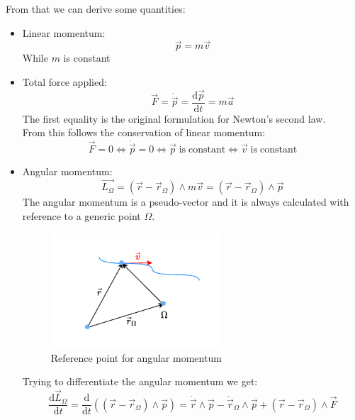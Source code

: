 From that we can derive some quantities:
\begin{itemize}
    \item Linear momentum: \begin{equation}\vec{p}=m\vec{v}\end{equation} While $m$ is constant
    \item Total force applied: \begin{equation}\vec{F}=\dot{\vec{p}}=\dfrac{\mathrm{d} \vec{p}}{\mathrm{d} t}=m\vec{a}\end{equation}The first equality is the original formulation for Newton's second law.\\From this follows the conservation of linear momentum:
    \begin{equation}\vec{F}=0 \iff\dot{\vec{p}}=0 \iff\vec{p}\;\mathrm{is\;constant} \iff\vec{v}\;\mathrm{is\;constant}\end{equation}
    \item Angular momentum:
    \begin{equation}
        \vec{L_{\Omega}} = \left(\vec{r}-\vec{r}_{\Omega}\right) \wedge m\vec{v} = \left(\vec{r}-\vec{r}_{\Omega}\right) \wedge \vec{p}
    \end{equation}
    The angular momentum is a pseudo-vector and it is always calculated with reference to a generic point $\Omega$.
    \begin{figure}[!ht]
        \centering
        \includegraphics[width=0.6\textwidth]{res/svg/omegareference.drawio}
        \caption{Reference point for angular momentum}
        \label{fig:image2}
    \end{figure}
    Trying to differentiate the angular momentum we get:
    \begin{equation}
        \dfrac{\mathrm{d}\vec{L}_{\Omega}}{\mathrm{d}t} = \dfrac{\mathrm{d}}{\mathrm{d}t}\left(\left(\vec{r}-\vec{r}_{\Omega}\right) \wedge \vec{p}\right) = \dot{\vec{r}}\wedge\vec{p} - \dot{\vec{r}}_{\Omega}\wedge\vec{p} + \left(\vec{r}-\vec{r}_{\Omega}\right) \wedge \vec{F}

\end{equation}
\end{itemize}
